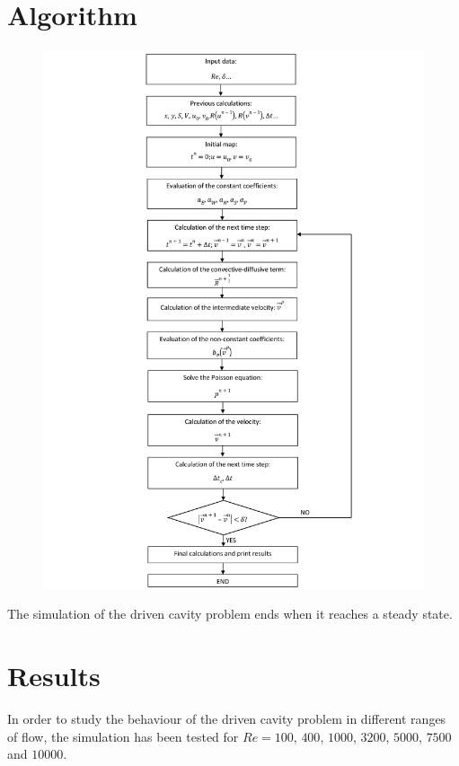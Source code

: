 \section{Algorithm}
\begin{figure}[H]
	\centering
	\includegraphics[scale=0.169]{DrivenCavity/algorithm}
\end{figure}
The simulation of the driven cavity problem ends when it reaches a steady state.

\section{Results}
In order to study the behaviour of the driven cavity problem in different ranges of flow, the simulation has been tested for $Re=100$, $400$, $1000$, $3200$, $5000$, $7500$ and $10000$.

